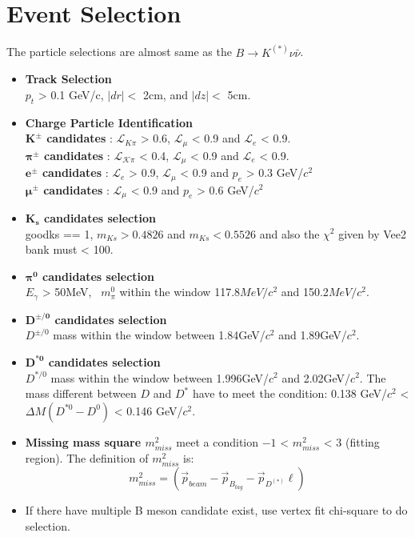 \section{Event Selection}
The particle selections are almost same as the $B \rightarrow K^{(*)} \nu \bar{\nu}$.
\begin{itemize}[leftmargin=*]
\item \textbf{Track Selection}\\
$p_t$ > 0.1 GeV/c, $|dr| <$ 2cm, and $|dz| <$ 5cm.
\item \textbf{Charge Particle Identification}\\
\textbf{$\bm{K^\pm}$ candidates} : $\mathcal{L}_{ K \pi}$ > 0.6,  $\mathcal{L_{\mu}}$ < 0.9 and  $\mathcal{L}_{e}$ < 0.9. \\
\textbf{$\bm{\pi^\pm}$ candidates} : $\mathcal{L_{ K \pi}}$ < 0.4,  $\mathcal{L_{\mu}}$ < 0.9 and  $\mathcal{L}_{e}$ < 0.9.\\
\textbf{$\bm{e^\pm}$ candidates} : $\mathcal{L}_{e}$ > 0.9, $\mathcal{L_{\mu}}$ < 0.9 and $p_e$ > 0.3 GeV/$c^2$ \\
\textbf{$\bm{\mu^\pm}$ candidates} : $\mathcal{L_{\mu}}$ < 0.9 and $p_e$ > 0.6 GeV/$c^2$
\item \textbf{$\bm{K_s}$ candidates selection}\\
goodks == 1, $m_{Ks} > 0.4826$ and $m_{Ks} < 0.5526$ and also the $\chi ^2$ given by Vee2 bank must < 100.
\item \textbf{$\bm{\pi^0}$ candidates selection}\\ 
$E_\gamma$ > 50MeV, \
$m_\pi^0$ within the window 117.8$MeV/c^2$ and 150.2$MeV/c^2$.
\item \textbf{$\bm{D^{\pm/0}}$ candidates selection}\\
$D^{\pm/0}$ mass within the window between 1.84GeV/$c^2$ and 1.89GeV/$c^2$.
\item \textbf{$\bm{D^{*0}}$ candidates selection}\\
$D^{*/0}$ mass within the window between 1.996GeV/$c^2$ and 2.02GeV/$c^2$. The mass different between $D$ and $D^*$ have to meet the condition: 0.138 GeV/$c^2$ < $\Delta M(D^{*0} - D^0)$ < 0.146 GeV/$c^2$.
\item \textbf{Missing mass square $m^2_{miss}$} meet a condition $-1$ < $m^2_{miss}$ < $3$ (fitting region). The definition of $m^2_{miss}$ is:
\begin{equation}
\label{eq:missmass2}
m^2_{miss} = (\vec{p}_{beam} - \vec{p}_{B_{tag}} - \vec{p}_{D^{(*)}} \ell)
\end{equation}
\item If there have multiple B meson candidate exist, use
vertex fit chi-square to do selection.
\end{itemize}

